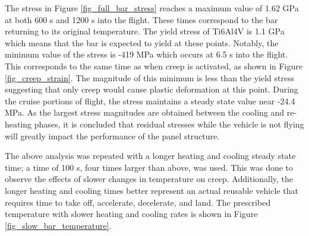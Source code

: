 \documentclass[conf]{new-aiaa}
\begin{document}

The stress in Figure \ref{fig_full_bar_stress} reaches a maximum value of 
1.62 GPa at both 600 s and 1200 s into the flight. 
These times correspond to the bar returning to its original temperature.
The yield stress of Ti6Al4V is 1.1 GPa 
\cite{boyer_materials_properties_handbook_titanium_alloys}
which means that the bar is expected to yield at these points.
Notably, the minimum value of the stress is -419 MPa 
which occurs at 6.5 s into the flight. 
This corresponds to the same time as when creep is activated,
as shown in Figure \ref{fig_creep_strain}.
The magnitude of this minimum is less than the yield 
stress suggesting that only creep would cause plastic deformation
at this point.
During the cruise portions of flight, the stress
maintains a steady state value near -24.4 MPa.
As the largest stress magnitudes are obtained between the cooling
and re-heating phases,
it is concluded that residual stresses while the vehicle is not
flying will greatly impact the performance of the panel structure.

The above analysis was repeated with a longer heating and cooling 
steady state time;
a time of 100 s, four times larger than above, was used.
This was done to observe the effects of slower
changes in temperature on creep.
Additionally, the longer heating and cooling times
better represent an actual reusable vehicle that requires
time to take off, accelerate, decelerate, and land.
The prescribed temperature with slower
heating and cooling rates is shown in Figure \ref{fig_slow_bar_temperature}.
\end{document}
